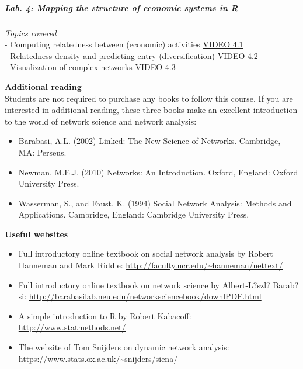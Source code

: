 \documentclass[
]{article}
\providecommand{\tightlist}{%
  \setlength{\itemsep}{0pt}\setlength{\parskip}{0pt}}
\begin{document}
\hypertarget{lab.-4-mapping-the-structure-of-economic-systems-in-r}{%
\subparagraph{\texorpdfstring{\textbf{Lab. 4: Mapping the structure of
economic systems in
R}}{Lab. 4: Mapping the structure of economic systems in R}}\label{lab.-4-mapping-the-structure-of-economic-systems-in-r}}

\emph{Topics covered}\\
- Computing relatedness between (economic) activities
\href{https://youtu.be/l5T0lGTQfWw}{VIDEO 4.1}\\
- Relatedness density and predicting entry (diversification)
\href{https://youtu.be/1G5bbk8ZXDA}{VIDEO 4.2}\\
- Visualization of complex networks
\href{https://youtu.be/rRK0o9GRCsg}{VIDEO 4.3}

\textbf{Additional reading}\\
Students are not required to purchase any books to follow this course.
If you are interested in additional reading, these three books make an
excellent introduction to the world of network science and network
analysis:

\begin{itemize}
\tightlist
\item
  Barabasi, A.L. (2002) Linked: The New Science of Networks. Cambridge,
  MA: Perseus.\\
\item
  Newman, M.E.J. (2010) Networks: An Introduction. Oxford, England:
  Oxford University Press.\\
\item
  Wasserman, S., and Faust, K. (1994) Social Network Analysis: Methods
  and Applications. Cambridge, England: Cambridge University Press.
\end{itemize}

\textbf{Useful websites}

\begin{itemize}
\tightlist
\item
  Full introductory online textbook on social network analysis by Robert
  Hanneman and Mark Riddle:
  \url{http://faculty.ucr.edu/~hanneman/nettext/}\\
\item
  Full introductory online textbook on network science by Albert-L?szl?
  Barab?si:
  \url{http://barabasilab.neu.edu/networksciencebook/downlPDF.html}\\
\item
  A simple introduction to R by Robert Kabacoff:
  \url{http://www.statmethods.net/}\\
\item
  The website of Tom Snijders on dynamic network analysis:
  \url{https://www.stats.ox.ac.uk/~snijders/siena/}
\end{itemize}
\end{document}
